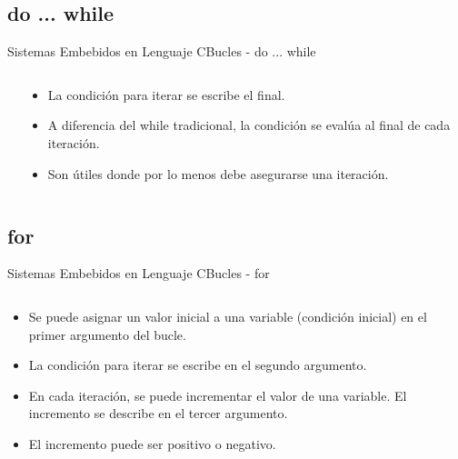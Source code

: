 \documentclass[aspectratio=169, xcolor=dvipsnames]{beamer}
\begin{document}
\subsection{do ... while}
\begin{frame}{Sistemas Embebidos en Lenguaje C}{Bucles - do ... while}
\begin{columns}
    \begin{column}{0.5\textwidth}
    
    \end{column}
    \begin{column}{0.5\textwidth}
    \begin{itemize}
        \item La condición para iterar se escribe el final.
        \item A diferencia del while tradicional, la condición se evalúa al final de cada iteración.
        \item Son útiles donde por lo menos debe asegurarse una iteración.
    \end{itemize}
    \end{column}
\end{columns}
\end{frame}

\subsection{for}
\begin{frame}{Sistemas Embebidos en Lenguaje C}{Bucles - for}
\begin{columns}
    \begin{column}{0.5\textwidth}
    \begin{itemize}
        \item Se puede asignar un valor inicial a una variable (condición inicial) en el primer argumento del bucle.
        \item La condición para iterar se escribe en el segundo argumento.
        \item En cada iteración, se puede incrementar el valor de una variable. El incremento se describe en el tercer argumento.
        \item El incremento puede ser positivo o negativo.
    \end{itemize}
    \end{column}
    \begin{column}{0.5\textwidth}
        
    \end{column}
\end{columns}
\end{frame}
\end{document}
